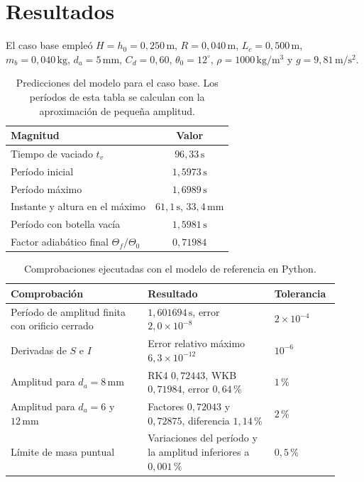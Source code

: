 \documentclass[11pt,a4paper]{article}
\begin{document}
\section{Resultados}
El caso base empleó \(H=h_0=0{,}250\,\mathrm{m}\),
\(R=0{,}040\,\mathrm{m}\), \(L_c=0{,}500\,\mathrm{m}\),
\(m_b=0{,}040\,\mathrm{kg}\), \(d_a=5\,\mathrm{mm}\), \(C_d=0{,}60\),
\(\theta_0=12^\circ\), \(\rho=1000\,\mathrm{kg/m^3}\) y
\(g=9{,}81\,\mathrm{m/s^2}\).

\begin{table}[htbp]
\centering
\caption{Predicciones del modelo para el caso base. Los períodos de esta
tabla se calculan con la aproximación de pequeña amplitud.}
\begin{tabular}{lc}
\toprule
Magnitud & Valor \\
\midrule
Tiempo de vaciado \(t_v\) & \(96{,}33\,\mathrm{s}\) \\
Período inicial & \(1{,}5973\,\mathrm{s}\) \\
Período máximo & \(1{,}6989\,\mathrm{s}\) \\
Instante y altura en el máximo & \(61{,}1\,\mathrm{s}\), \(33{,}4\,\mathrm{mm}\) \\
Período con botella vacía & \(1{,}5981\,\mathrm{s}\) \\
Factor adiabático final \(\Theta_f/\Theta_0\) & \(0{,}71984\) \\
\bottomrule
\end{tabular}
\end{table}

\begin{table}[htbp]
\centering
\caption{Comprobaciones ejecutadas con el modelo de referencia en Python.}
\small
\begin{tabular}{@{}p{0.39\linewidth}p{0.36\linewidth}p{0.17\linewidth}@{}}
\toprule
Comprobación & Resultado & Tolerancia \\
\midrule
Período de amplitud finita con orificio cerrado &
\(1{,}601694\,\mathrm{s}\), error \(2{,}0\times10^{-8}\) &
\(2\times10^{-4}\) \\
Derivadas de \(S\) e \(I\) &
Error relativo máximo \(6{,}3\times10^{-12}\) & \(10^{-6}\) \\
Amplitud para \(d_a=8\,\mathrm{mm}\) &
RK4 \(0{,}72443\), WKB \(0{,}71984\), error \(0{,}64\,\%\) & \(1\,\%\) \\
Amplitud para \(d_a=6\) y \(12\,\mathrm{mm}\) &
Factores \(0{,}72043\) y \(0{,}72875\), diferencia \(1{,}14\,\%\) & \(2\,\%\) \\
Límite de masa puntual &
Variaciones del período y la amplitud inferiores a \(0{,}001\,\%\) &
\(0{,}5\,\%\) \\
\bottomrule
\end{tabular}
\end{table}
\end{document}
